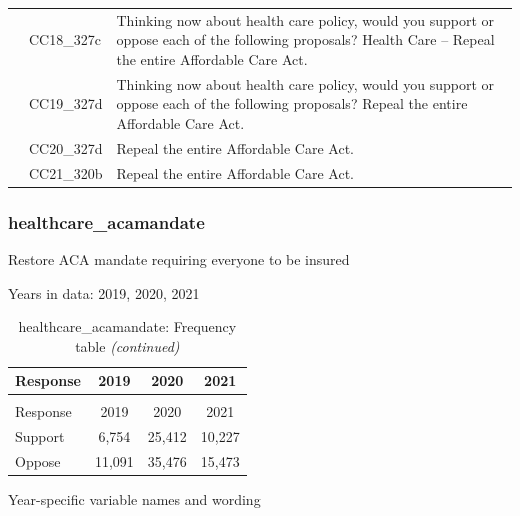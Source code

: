 \documentclass[
  12pt]{article}
\begin{document}
\begin{longtable}[t]{rl>{\raggedright\arraybackslash}p{10cm}}
\addlinespace
2018 & CC18\_327c & Thinking now about health care policy, would you support or oppose each of the following proposals? Health Care – Repeal the entire Affordable Care Act.\\
\addlinespace
2019 & CC19\_327d & Thinking now about health care policy, would you support or oppose each of the following proposals? Repeal the entire Affordable Care Act.\\
\addlinespace
2020 & CC20\_327d & Repeal the entire Affordable Care Act.\\
\addlinespace
2021 & CC21\_320b & Repeal the entire Affordable Care Act.\\*
\end{longtable}
\endgroup{}

\hypertarget{healthcare_acamandate}{%
\subsubsection{healthcare\_acamandate}\label{healthcare_acamandate}}

Restore ACA mandate requiring everyone to be insured

Years in data: 2019, 2020, 2021\begingroup\fontsize{10}{12}\selectfont

\begin{longtable}[t]{lccc}
\caption{\label{tab:unnamed-chunk-5}healthcare\_acamandate: Frequency table}\\
\toprule
Response & 2019 & 2020 & 2021\\
\midrule
\endfirsthead
\caption[]{healthcare\_acamandate: Frequency table \textit{(continued)}}\\
\toprule
Response & 2019 & 2020 & 2021\\
\midrule
\endhead

\endfoot
\bottomrule
\endlastfoot
Support & 6,754 & 25,412 & 10,227\\
Oppose & 11,091 & 35,476 & 15,473\\*
\end{longtable}
\endgroup{}

Year-specific variable names and
wording\begingroup\fontsize{11}{13}\selectfont
\end{document}
